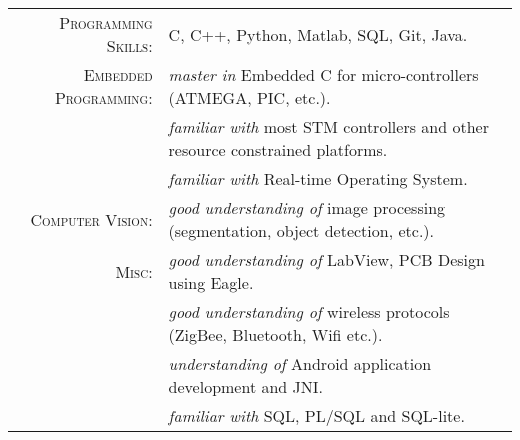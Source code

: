 %
%


 
\renewcommand{\arraystretch}{1.1}

	\begin{tabular}{>{}r>{}p{13cm}} 
		\textsc{Programming Skills:}    &  C, C++, Python, Matlab, SQL, Git, Java.\\  
		\textsc{Embedded Programming:} 		&  \emph{master in} Embedded C for micro-controllers (ATMEGA, PIC, etc.).\\
										&  \emph{familiar with} most  STM controllers and other resource constrained platforms.\\
										&  \emph{familiar with} Real-time Operating System.\\
		\textsc{Computer Vision:}		&   \emph{good understanding of} image processing (segmentation, object detection, etc.). \\
		\textsc{Misc:}	&	\emph{good understanding of} LabView, PCB Design using Eagle.\\
						&	\emph{good understanding of} wireless protocols (ZigBee, Bluetooth, Wifi etc.).\\
						&	\emph{understanding of}  Android application development and JNI.\\
						&	\emph{familiar with} SQL, PL/SQL and SQL-lite. 
	\end{tabular}